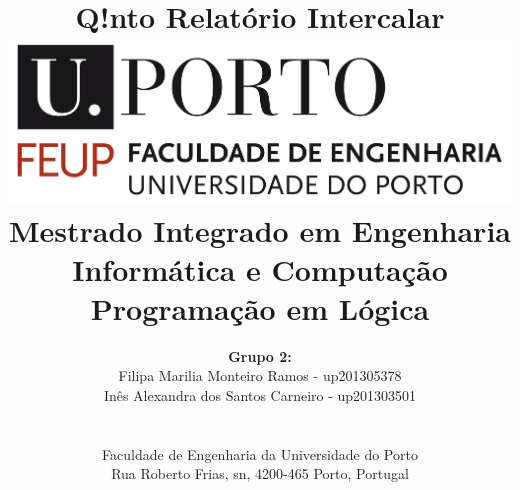 \documentclass[a4paper]{article}
\begin{document}
\setlength{\textwidth}{16cm}
\setlength{\textheight}{22cm}

\title{\Huge\textbf{Q!nto}\linebreak\linebreak\linebreak
\Large\textbf{Relatório Intercalar}\linebreak\linebreak
\linebreak\linebreak
\includegraphics[scale=0.1]{feup-logo.png}\linebreak\linebreak
\linebreak\linebreak
\Large{Mestrado Integrado em Engenharia Informática e Computação} \linebreak\linebreak
\Large{Programação em Lógica}\linebreak
}

\author{\textbf{Grupo 2:}\\
Filipa Marilia Monteiro Ramos - up201305378 \\
Inês Alexandra dos Santos Carneiro - up201303501 \\
\linebreak\linebreak \\
 \\ Faculdade de Engenharia da Universidade do Porto \\ Rua Roberto Frias, s\/n, 4200-465 Porto, Portugal \linebreak\linebreak\linebreak
\linebreak\linebreak\vspace{1cm}}

\maketitle
\thispagestyle{empty}
\end{document}
